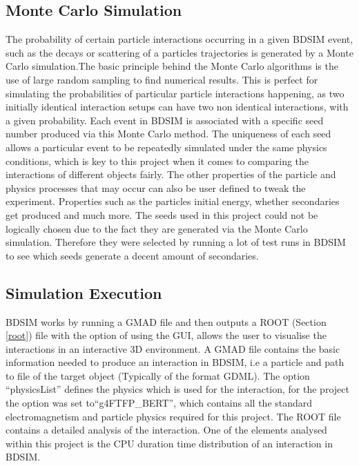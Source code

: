 \documentclass[12pt,a4paper]{article}
\begin{document}
\subsection{Monte Carlo Simulation}
\label{monte}
\noindent The probability of certain particle interactions occurring in a given BDSIM event, such as the decays or scattering of a particles trajectories is generated by a Monte Carlo simulation.The basic principle behind the Monte Carlo algorithms is the use of large random sampling to find numerical results. This is perfect for simulating the probabilities of particular particle interactions happening, as two initially identical interaction setups can have two non identical interactions, with a given probability. Each event in BDSIM is associated with a specific seed number produced via this Monte Carlo method. The uniqueness of each seed allows a particular event to be repeatedly simulated under the same physics conditions, which is key to this project when it comes to comparing the interactions of different objects fairly. The other properties of the particle and physics processes that may occur can also be user defined to tweak the experiment. Properties such as the particles initial energy, whether secondaries get produced and much more. The seeds used in this project could not be logically chosen due to the fact they are generated via the Monte Carlo simulation. Therefore they were selected by running a lot of test runs in BDSIM to see which seeds generate a decent amount of secondaries.

\subsection{Simulation Execution}
BDSIM works by running a GMAD file and then outputs  a ROOT (Section \ref{root}) file with the option of using the GUI, allows the user to visualise the interactions in an interactive 3D environment. A GMAD file contains the basic information needed to produce an interaction in BDSIM, i.e a particle and path to file of the target object (Typically of the format GDML). The option ``physicsList'' defines the physics which is used for the interaction, for the project the option was set to``g4FTFP\_BERT'', which contains all the standard electromagnetism and particle physics required for this project. The ROOT file contains a detailed analysis of the interaction. One of the elements analysed within this project is the CPU duration time distribution of an interaction in BDSIM.

\newpage
\end{document}
